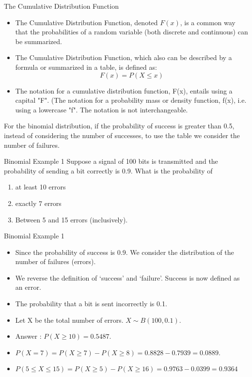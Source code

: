 \documentclass[]{report}
\begin{document}

{The Cumulative Distribution Function}
\begin{itemize}
\item The Cumulative Distribution Function, denoted $F(x)$, is a common way that the probabilities
of a random variable (both discrete and continuous) can be summarized.
\item The Cumulative Distribution Function, which also can be
described by a formula or summarized in a table, is defined as:
\[F(x) = P(X \leq x) \]
\item The notation for a cumulative distribution function, F(x), entails using a capital
"F".  (The notation for a probability mass or density function, f(x), i.e. using a lowercase "f". The notation is not interchangeable.
\end{itemize}


For the binomial distribution, if the probability of success is greater than 0.5, instead of
considering the number of successes, to use the table we consider
the number of failures.




{Binomial Example 1}
Suppose a signal of 100 bits is transmitted and the probability of
sending a bit correctly is 0.9. What is the probability of
\begin{enumerate}
\item at least 10 errors
\item exactly 7 errors
\item Between 5 and 15 errors (inclusively).
\end{enumerate}


{Binomial Example 1}
\begin{itemize}
\item Since the probability of success is 0.9. We consider the distribution
of the number of failures (errors).
\item We reverse the definition of `success' and `failure'. Success is now defined as an error.
\item The probability that a bit is sent incorrectly is 0.1.
\item Let X be the total number of errors. $X \sim B(100, 0.1)$.
\item Answer : $P(X \geq 10) = 0.5487$.
\item $P(X = 7)=P(X \geq 7) - P(X \geq 8) =0.8828 - 0.7939 = 0.0889$.
\item $P(5 \leq X  \leq 15) = P(X \geq 5) - P(X \geq 16) =0.9763 - 0.0399 = 0.9364$
\end{itemize}
\end{document}
